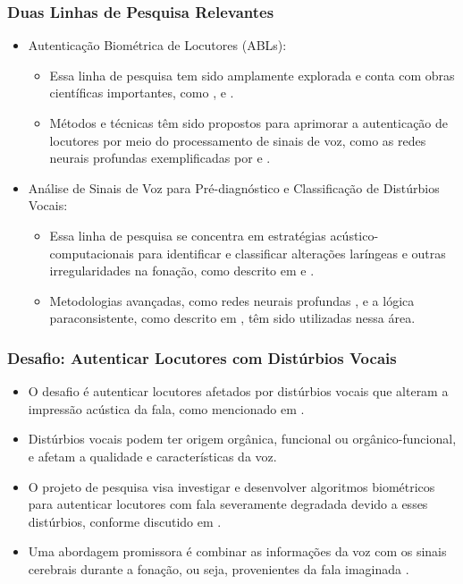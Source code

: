 \documentclass{beamer}
\begin{document}
	\begin{frame}
		\frametitle{Duas Linhas de Pesquisa Relevantes}
		\begin{itemize}
			\item Autenticação Biométrica de Locutores (ABLs):
			\begin{itemize}
				\item Essa linha de pesquisa tem sido amplamente explorada e conta com obras científicas importantes, como \cite{furlan2021caracterizacao}, \cite{beigi2011speaker} e \cite{neustein2012forensic}.
				\item Métodos e técnicas têm sido propostos para aprimorar a autenticação de locutores por meio do processamento de sinais de voz, como as redes neurais profundas exemplificadas por \cite{mittal2021deep} e \cite{miliaresi2021combining}.
			\end{itemize}
			\item Análise de Sinais de Voz para Pré-diagnóstico e Classificação de Distúrbios Vocais:
			\begin{itemize}
				\item Essa linha de pesquisa se concentra em estratégias acústico-computacionais para identificar e classificar alterações laríngeas e outras irregularidades na fonação, como descrito em \cite{chaiani2022voice} e \cite{fujimura2022classification}.
				\item Metodologias avançadas, como redes neurais profundas \cite{goodfellow2016deep}, e a lógica paraconsistente, como descrito em \cite{fonseca2017linear}, têm sido utilizadas nessa área.
			\end{itemize}
		\end{itemize}
	\end{frame}
	
	\begin{frame}
		\frametitle{Desafio: Autenticar Locutores com Distúrbios Vocais}
		\begin{itemize}
			\item O desafio é autenticar locutores afetados por distúrbios vocais que alteram a impressão acústica da fala, como mencionado em \cite{le2005voz, le2005voz2}.
			\item Distúrbios vocais podem ter origem orgânica, funcional ou orgânico-funcional, e afetam a qualidade e características da voz.
			\item O projeto de pesquisa visa investigar e desenvolver algoritmos biométricos para autenticar locutores com fala severamente degradada devido a esses distúrbios, conforme discutido em \cite{gupta2021residual}.
			\item Uma abordagem promissora é combinar as informações da voz com os sinais cerebrais durante a fonação, ou seja, provenientes da fala imaginada \cite{moctezuma2019subjects}.
		\end{itemize}
	\end{frame}
	
\end{document}
